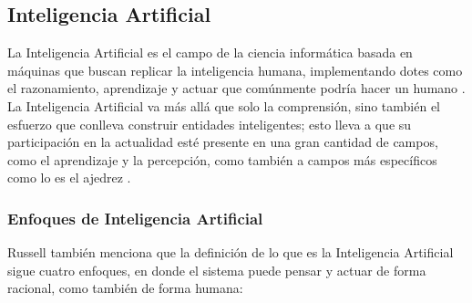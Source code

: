 

 
\subsection{Inteligencia Artificial}
La Inteligencia Artificial es el campo de la ciencia informática basada en máquinas que buscan replicar la inteligencia humana, implementando dotes como el razonamiento, aprendizaje y actuar que comúnmente podría hacer un humano \parencite{gl_DEFIA}. La Inteligencia Artificial va más allá que solo la comprensión, sino también el esfuerzo que conlleva construir entidades inteligentes; esto lleva a que su participación en la actualidad esté presente en una gran cantidad de campos, como el aprendizaje y la percepción, como también a campos más específicos como lo es el ajedrez \parencite{bk_russell2004intart}.
\subsubsection{Enfoques de Inteligencia Artificial \parencite{bk_russell2004intart}}
Russell también menciona que la definición de lo que es la Inteligencia Artificial sigue cuatro enfoques, en donde el sistema puede pensar y actuar de forma racional, como también de forma humana: 

